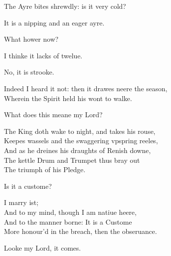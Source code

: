 \documentclass[a5paper,DIV=calc,11pt]{scrbook}
\begin{document}

\begin{drama*}
    \hamspeaks The Ayre bites shrewdly: is it very cold?
    
    \horspeaks It is a nipping and an eager ayre.
    
    \hamspeaks What hower now?
    
    \horspeaks I thinke it lacks of twelue.
    
    \marspeaks No, it is strooke.
    
    \horspeaks Indeed I heard it not: then it drawes neere the season,\\
    Wherein the Spirit held his wont to walke.
    
    What does this meane my Lord?
    
    \hamspeaks The King doth wake to night, and takes his rouse,\\
    Keepes wassels and the swaggering vpspring reeles,\\
    And as he dreines his draughts of Renish downe,\\
    The kettle Drum and Trumpet thus bray out\\
    The triumph of his Pledge.
    
    \horspeaks Is it a custome?
    
    \hamspeaks I marry ist;\\
    And to my mind, though I am natiue heere,\\
    And to the manner borne: It is a Custome\\
    More honour'd in the breach, then the obseruance.
    
    
    \horspeaks Looke my Lord, it comes.
    

\end{drama*}
\end{document}
